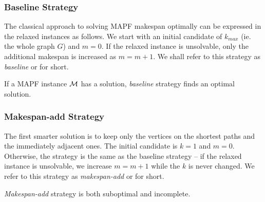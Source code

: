 \subsubsection{Baseline Strategy}

The classical approach to solving MAPF makespan optimally can be expressed in the relaxed instances as follows. We start with an initial candidate of $k_{max}$ (ie. the whole graph $G$) and $m=0$. If the relaxed instance is unsolvable, only the additional makespan is increased as $m=m+1$. %
We shall refer to this strategy as \emph{baseline} or \ssb{} for short.

\begin{prop}\label{prop:baseline}
If a MAPF instance $\mathcal{M}$ has a solution, \emph{baseline} strategy finds an optimal solution.
\end{prop}


\subsubsection{Makespan-add Strategy}

The first smarter solution is to keep only the vertices on the shortest paths and the immediately adjacent ones. The initial candidate is $k=1$ and $m=0$. Otherwise, the strategy is the same as the baseline strategy -- if the relaxed instance is unsolvable, we increase $m = m+1$ while the $k$ is never changed. We refer to this strategy as \emph{makespan-add} or \ssm{} for short.

\begin{prop}
\emph{Makespan-add} strategy is both suboptimal and incomplete.~\cite{AAMAS_corridors}
\end{prop}


